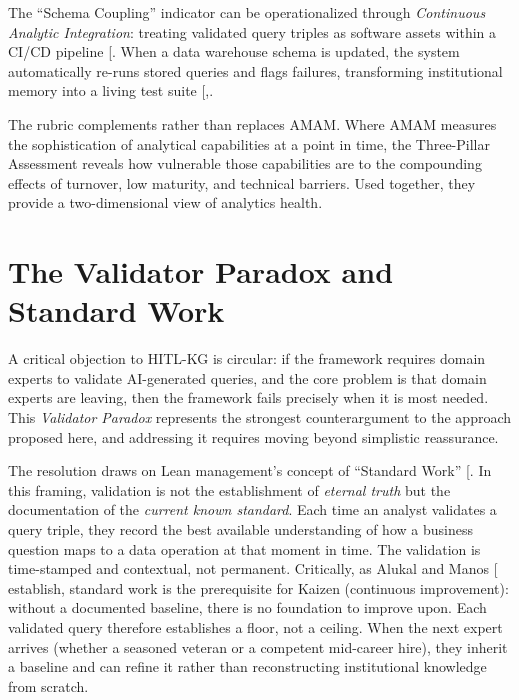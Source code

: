 \documentclass[
  american,
  11pt,
  letterpaper,
  oneside  ,captions=tableheading
]{scrartcl}
\begin{document}
The ``Schema Coupling'' indicator can be operationalized through
\emph{Continuous Analytic Integration}: treating validated query triples
as software assets within a CI/CD pipeline
{[}\citeproc{ref-valiaiev2025}{69}{]}. When a data warehouse schema is
updated, the system automatically re-runs stored queries and flags
failures, transforming institutional memory into a living test suite
{[},\citeproc{ref-kottam2025}{71}{]}.

The rubric complements rather than replaces AMAM. Where AMAM measures
the sophistication of analytical capabilities at a point in time, the
Three-Pillar Assessment reveals how vulnerable those capabilities are to
the compounding effects of turnover, low maturity, and technical
barriers. Used together, they provide a two-dimensional view of
analytics health.

\section{The Validator Paradox and Standard
Work}\label{the-validator-paradox-and-standard-work}

A critical objection to HITL-KG is circular: if the framework requires
domain experts to validate AI-generated queries, and the core problem is
that domain experts are leaving, then the framework fails precisely when
it is most needed. This \emph{Validator Paradox} represents the
strongest counterargument to the approach proposed here, and addressing
it requires moving beyond simplistic reassurance.

The resolution draws on Lean management's concept of ``Standard Work''
{[}\citeproc{ref-alukal2006}{72}{]}. In this framing, validation is not
the establishment of \emph{eternal truth} but the documentation of the
\emph{current known standard}. Each time an analyst validates a query
triple, they record the best available understanding of how a business
question maps to a data operation at that moment in time. The validation
is time-stamped and contextual, not permanent. Critically, as Alukal and
Manos {[}\citeproc{ref-alukal2006}{72}{]} establish, standard work is
the prerequisite for Kaizen (continuous improvement): without a
documented baseline, there is no foundation to improve upon. Each
validated query therefore establishes a floor, not a ceiling. When the
next expert arrives (whether a seasoned veteran or a competent
mid-career hire), they inherit a baseline and can refine it rather than
reconstructing institutional knowledge from scratch.
\end{document}
